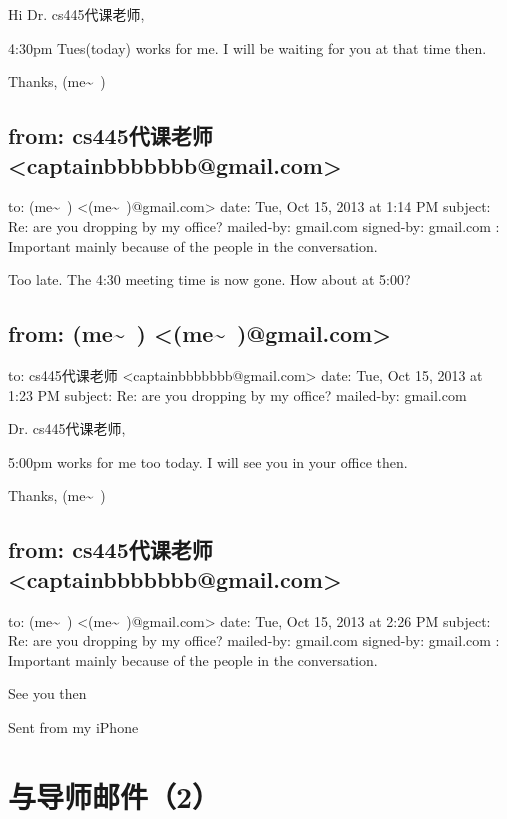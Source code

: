 \documentclass[12pt]{book}
\begin{document}
Hi Dr. cs445代课老师, 

4:30pm Tues(today) works for me. I will be waiting for you at that time then. 

Thanks,
(me\textasciitilde{}~)

\subsection{from:         cs445代课老师 <captainbbbbbbb@gmail.com>}
\label{sec-22-1-9}
to:         (me\textasciitilde{}~) <(me\textasciitilde{}~)@gmail.com>
date:         Tue, Oct 15, 2013 at 1:14 PM
subject:         Re: are you dropping by my office?
mailed-by:         gmail.com
signed-by:         gmail.com
:         Important mainly because of the people in the conversation.

Too late.   The 4:30 meeting time is now gone.   How about at 5:00?

\subsection{from:         (me\textasciitilde{}~) <(me\textasciitilde{}~)@gmail.com>}
\label{sec-22-1-10}
to:         cs445代课老师 <captainbbbbbbb@gmail.com>
date:         Tue, Oct 15, 2013 at 1:23 PM
subject:         Re: are you dropping by my office?
mailed-by:         gmail.com

Dr. cs445代课老师, 

5:00pm works for me too today. I will see you in your office then. 

Thanks,
(me\textasciitilde{}~)

\subsection{from:         cs445代课老师 <captainbbbbbbb@gmail.com>}
\label{sec-22-1-11}
to:         (me\textasciitilde{}~) <(me\textasciitilde{}~)@gmail.com>
date:         Tue, Oct 15, 2013 at 2:26 PM
subject:         Re: are you dropping by my office?
mailed-by:         gmail.com
signed-by:         gmail.com
:         Important mainly because of the people in the conversation.

See you then

Sent from my iPhone

\section{与导师邮件（2）}
\label{sec-22-2}
\end{document}
